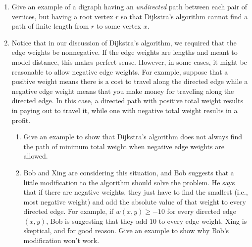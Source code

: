 \begin{enumerate}
\item Give an example of a digraph having an \emph{undirected} path
  between each pair of vertices, but having a root vertex $r$ so that
  Dijkstra's algorithm cannot find a path of finite length from $r$ to some
  vertex $x$.
\item Notice that in our discussion of Dijkstra's algorithm, we
  required that the edge weights be nonnegative. If the edge weights
  are lengths and meant to model distance, this makes perfect
  sense. However, in some cases, it might be reasonable to allow
  negative edge weights. For example, suppose that a positive weight
  means there is a cost to travel along the directed edge while a
  negative edge weight means that you make money for traveling along
  the directed edge. In this case, a directed path with positive total
  weight results in paying out to travel it, while one with negative
  total weight results in a profit.
  \begin{enumerate}
  \item Give an example to show that Dijkstra's algorithm does not
    always find the path of minimum total weight when negative edge
    weights are allowed.
  \item Bob and Xing are considering this situation, and Bob suggests
    that a little modification to the algorithm should solve the
    problem. He says that if there are negative weights, they just
    have to find the smallest (i.e., most negative weight) and add the
    absolute value of that weight to every directed edge. For example, if
    $w(x,y)\geq -10$ for every directed edge $(x,y)$, Bob is
    suggesting that they add $10$ to every edge weight. Xing is
    skeptical, and for good reason. Give an example to show why Bob's
    modification won't work.
  \end{enumerate}


\end{enumerate}

